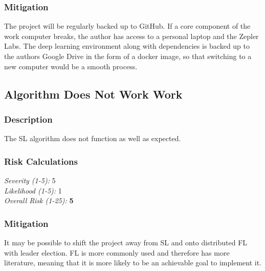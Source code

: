 \subsubsection{Mitigation}
The project will be regularly backed up to GitHub. If a core component of the work computer breaks, the author has access to a personal laptop and the Zepler Labs. The deep learning environment along with dependencies is backed up to the authors Google Drive in the form of a docker image, so that switching to a new computer would be a smooth process.

\subsection{Algorithm Does Not Work Work}
\subsubsection{Description}
The SL algorithm does not function as well as expected.

\subsubsection{Risk Calculations}
\emph{Severity (1-5):} 5 \\
\emph{Likelihood (1-5):} 1 \\
\emph{Overall Risk (1-25):} \textbf{5}

\subsubsection{Mitigation}
It may be possible to shift the project away from SL and onto distributed FL with leader election. FL is more commonly used and therefore has more literature, meaning that it is more likely to be an achievable goal to implement it.